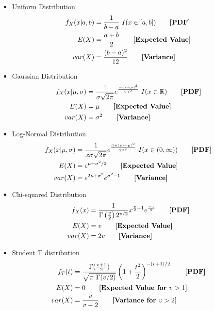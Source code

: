 \documentclass{article}
\begin{document}
\begin{multicols}{2}
\begin{itemize}
  \item Uniform Distribution
  \begin{align*}
    f_X(x|a,b) &= \frac{1}{b-a}~ I(x \in [a,b]) \tag*{\textbf{[PDF]}}\\
    E(X) &= \frac{a+b}{2} \tag*{\textbf{[Expected Value]}}\\
    var(X) &= \frac{(b-a)^2}{12} \tag*{\textbf{[Variance]}}
  \end{align*}
  \item Gaussian Distribution
  \begin{align*}
    f_X(x|\mu,\sigma) &= \frac{1}{\sigma\sqrt{2\pi}} e^{\frac{-(x-\mu)^2}{2\sigma^2}}~ I(x \in \mathbb{R}) \tag*{\textbf{[PDF]}}\\
    E(X) &= \mu\tag*{\textbf{[Expected Value]}}\\ 
    var(X) &= \sigma^2\tag*{\textbf{[Variance]}}\\ 
  \end{align*}
  \item Log-Normal Distribution
  \begin{align*}
    f_X(x|\mu, \sigma) &= \frac{1}{x \sigma \sqrt{2 \pi}} e^{\frac{(ln(x)-\mu)^2}{2 \sigma^2}}~ I(x \in (0,\infty)) \tag*{\textbf{[PDF]}}\\
	  E(X) &= e^{\mu + \sigma^2/2} \tag*{\textbf{[Expected Value]}}\\
  	var(X) &= e^{2\mu + \sigma^2}e^{\sigma^2-1} \tag*{\textbf{[Variance]}}\\
  \end{align*}
  \item Chi-squared Distribution
  \begin{align*}
    f_X(x) &= \frac{1}{\Gamma\left(\frac{v}{2}\right)2^{v/2}} x^{\frac{v}{2}-1} e^{\frac{-x}{2}} \tag*{\textbf{[PDF]}}\\
    E(X) &= v \tag*{\textbf{[Expected Value]}}\\
    var(X) &= 2v \tag*{\textbf{[Variance]}}\\
  \end{align*}
  \item Student T distribution
  \begin{align*}
      f_T(t) &= \frac{\Gamma(\frac{v+1}{2})}{\sqrt{\pi~\Gamma(v/2)}} \left(1+\frac{t^2}{2}\right)^{-(v+1)/2}\tag*{\textbf{[PDF]}}\\
      E(X) &= 0 \tag*{\textbf{[Expected Value for $v>1$]}}\\
      var(X) &= \frac{v}{v-2} \tag*{\textbf{[Variance for $v>2$]}}\\

\end{align*}
\end{itemize}
\end{multicols}
\end{document}
